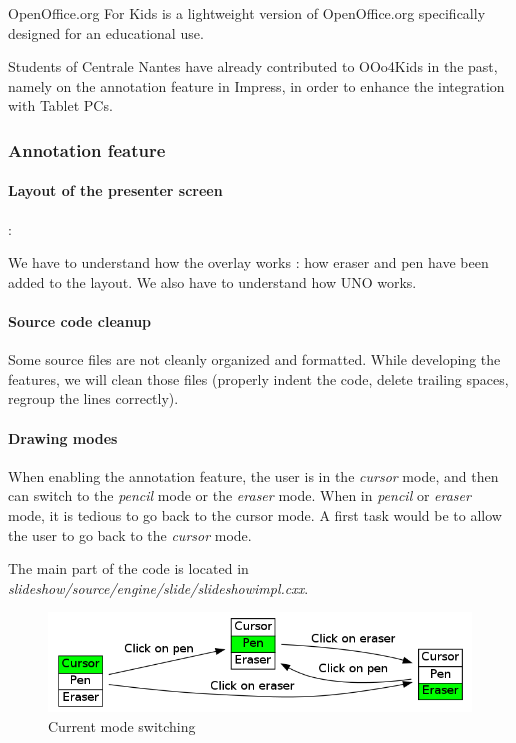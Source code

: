 \documentclass[a4paper,11pt]{article}
\begin{document}
OpenOffice.org For Kids is a lightweight version of OpenOffice.org
specifically designed for an educational use.

Students of Centrale Nantes have already contributed to OOo4Kids in the past,
namely on the annotation feature in Impress, in order to enhance the
integration with Tablet PCs.


\subsubsection*{Annotation feature}


\paragraph*{Layout of the presenter screen} :

We have to understand how the overlay works : how eraser and pen have been
added to the layout. We also have to understand how UNO works.



\paragraph*{Source code cleanup}

Some source files are not cleanly organized and formatted. While developing
the features, we will clean those files (properly indent the code, delete
trailing spaces, regroup the lines correctly).


\paragraph*{Drawing modes}

When enabling the annotation feature, the user is in the \emph{cursor} mode,
and then can switch to the \emph{pencil} mode or the \emph{eraser} mode. When
in \emph{pencil} or \emph{eraser} mode, it is tedious to go back to the cursor
mode. A first task would be to allow the user to go back to the \emph{cursor}
mode.

The main part of the code is located in
\emph{slideshow/source/engine/slide/slideshowimpl.cxx}.

\begin{figure}[!h]
\centering
\includegraphics[scale=0.5]{images/modes_current.png}
\caption{Current mode switching}
\end{figure}
\end{document}
